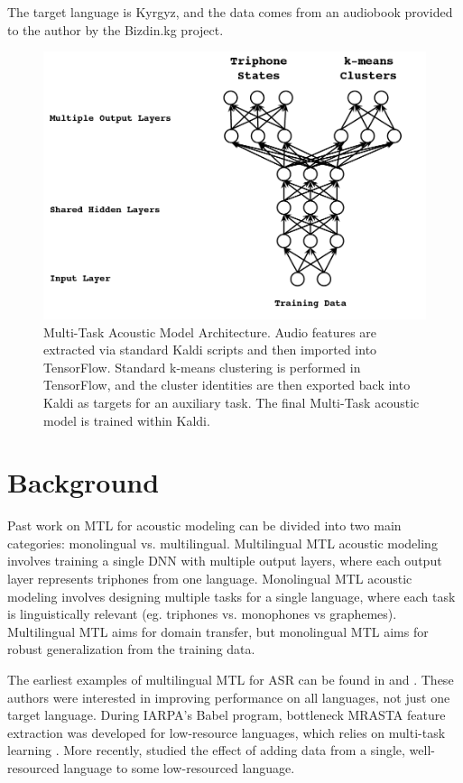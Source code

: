\documentclass[a4paper]{article}
\begin{document}
The target language is Kyrgyz, and the data comes from an audiobook provided to the author by the Bizdin.kg project.

\begin{figure}[!htbp]
  \centering
{}
  \includegraphics[width=\linewidth]{figs/heigold-2013-dnn-c.png}
  \caption{Multi-Task Acoustic Model Architecture. Audio features are extracted via standard Kaldi scripts and then imported into TensorFlow. Standard k-means clustering is performed in TensorFlow, and the cluster identities are then exported back into Kaldi as targets for an auxiliary task. The final Multi-Task acoustic model is trained within Kaldi.}
    \label{fig:mtl-dnn}
  \endminipage\hfill
\end{figure}


\section{Background}

Past work on MTL for acoustic modeling can be divided into two main categories: monolingual vs. multilingual. Multilingual MTL acoustic modeling involves training a single DNN with multiple output layers, where each output layer represents triphones from one language. Monolingual MTL acoustic modeling involves designing multiple tasks for a single language, where each task is linguistically relevant (eg. triphones vs. monophones vs graphemes). Multilingual MTL aims for domain transfer, but monolingual MTL aims for robust generalization from the training data.

The earliest examples of multilingual MTL for ASR can be found in \cite{huang2013} and \cite{heigold2013}. These authors were interested in improving performance on all languages, not just one target language. During IARPA's Babel program, bottleneck MRASTA feature extraction was developed for low-resource languages, which relies on multi-task learning \cite{tuske2014multilingual}. More recently, \cite{grezl2016} studied the effect of adding data from a single, well-resourced language to some low-resourced language.
\end{document}
